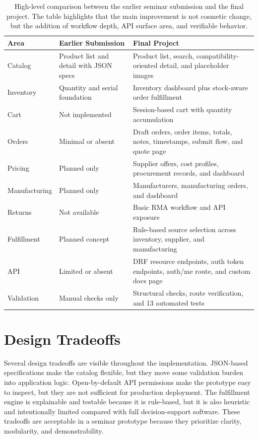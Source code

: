 \documentclass[12pt,letterpaper,oneside,openany]{book}
\begin{document}
\begin{table}[H]
\centering
\begin{tabular}{|p{1.6in}|p{2.15in}|p{2.35in}|}
\hline
\textbf{Area} & \textbf{Earlier Submission} & \textbf{Final Project} \\ \hline
Catalog & Product list and detail with JSON specs & Product list, search, compatibility-oriented detail, and placeholder images \\ \hline
Inventory & Quantity and serial foundation & Inventory dashboard plus stock-aware order fulfillment \\ \hline
Cart & Not implemented & Session-based cart with quantity accumulation \\ \hline
Orders & Minimal or absent & Draft orders, order items, totals, notes, timestamps, submit flow, and quote page \\ \hline
Pricing & Planned only & Supplier offers, cost profiles, procurement records, and dashboard \\ \hline
Manufacturing & Planned only & Manufacturers, manufacturing orders, and dashboard \\ \hline
Returns & Not available & Basic RMA workflow and API exposure \\ \hline
Fulfillment & Planned concept & Rule-based source selection across inventory, supplier, and manufacturing \\ \hline
API & Limited or absent & DRF resource endpoints, auth token endpoints, auth/me route, and custom docs page \\ \hline
Validation & Manual checks only & Structural checks, route verification, and 13 automated tests \\ \hline
\end{tabular}
\caption{High-level comparison between the earlier seminar submission and the
final project. The table highlights that the main improvement is not cosmetic
change, but the addition of workflow depth, API surface area, and verifiable
behavior.}
\label{tab:comparison}
\end{table}

\section{Design Tradeoffs}

\begin{justifying}
Several design tradeoffs are visible throughout the implementation. JSON-based
specifications make the catalog flexible, but they move some validation burden
into application logic. Open-by-default API permissions make the prototype easy
to inspect, but they are not sufficient for production deployment. The
fulfillment engine is explainable and testable because it is rule-based, but it
is also heuristic and intentionally limited compared with full decision-support
software. These tradeoffs are acceptable in a seminar prototype because they
prioritize clarity, modularity, and demonstrability.
\end{justifying}
\end{document}
